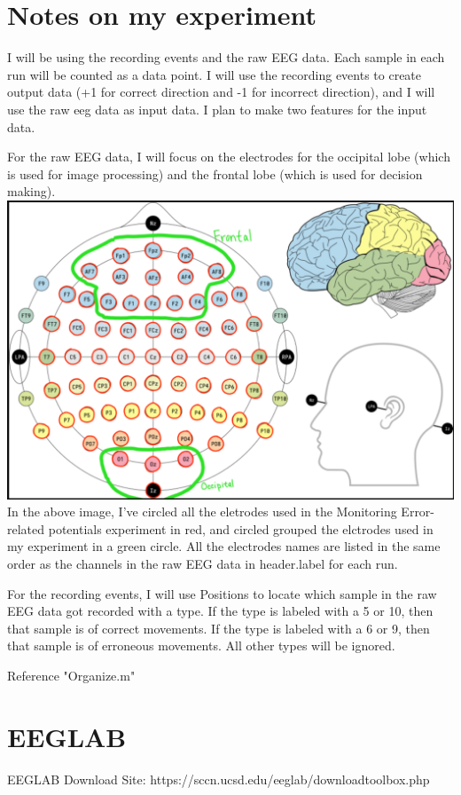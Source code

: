 \documentclass[12pt]{article}
\begin{document}
\section{Notes on my experiment}
I will be using the recording events and the raw EEG data. Each sample in each run will be counted as a data point. I will use the recording events to create output data (+1 for correct direction and -1 for incorrect direction), and I will use the raw eeg data as input data. I plan to make two features for the input data.

For the raw EEG data, I will focus on the electrodes for the occipital lobe (which is used for image processing) and the frontal lobe (which is used for decision making).\newline
\includegraphics[scale=0.4]{ElectrodePlacements}\newline
In the above image, I've circled all the eletrodes used in the Monitoring Error-related potentials experiment in red, and circled grouped the elctrodes used in my experiment in a green circle. All the electrodes names are listed in the same order as the channels in the raw EEG data in header.label for each run. 

For the recording events, I will use Positions to locate which sample in the raw EEG data got recorded with a type. If the type is labeled with a 5 or 10, then that sample is of correct movements. If the type is labeled with a 6 or 9, then that sample is of erroneous movements. All other types will be ignored.

Reference "Organize.m"

\section{EEGLAB}
EEGLAB Download Site: https://sccn.ucsd.edu/eeglab/downloadtoolbox.php
\end{document}

